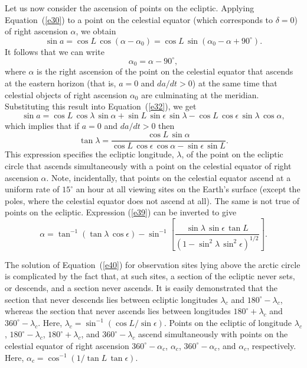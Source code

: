 Let us now consider the ascension of points on the ecliptic.
Applying Equation~(\ref{e30}) to a point on the celestial equator (which corresponds to $\delta=0$)
of right ascension $\alpha$, we obtain
\begin{equation}
\sin a = \cos L\,\cos(\alpha - \alpha_0) = \cos L\,\sin (\alpha_0-\alpha + 90^\circ).
\end{equation}
It follows that we can write
\begin{equation}
\alpha_0 = \alpha-90^\circ,
\end{equation}
where $\alpha$ is the right ascension of the point on the celestial equator that 
ascends at the eastern horizon (that is, $a=0$ and $da/dt>0$) at the same time that celestial objects of right ascension $\alpha_0$ are culminating at
the meridian. Substituting this result into Equation~(\ref{e32}), 
we get
\begin{equation}
\sin a= \cos L\,\cos\lambda\,\sin\alpha + \sin L\,\sin\epsilon\,\sin\lambda - \cos L\,\cos\epsilon\,\sin\lambda\,\cos\alpha,
\end{equation}
which implies that if $a=0$ and $da/dt>0$ then
\begin{equation}\label{e39}
\tan \lambda = \frac{\cos L\,\sin \alpha}{\cos L\,\cos\epsilon\,\cos\alpha-\sin\epsilon\,\sin L}.
\end{equation}
This expression 
specifies the ecliptic longitude, $\lambda$, of the point on the ecliptic circle that 
ascends simultaneously with a point on the celestial equator of right ascension $\alpha$. 
Note, incidentally, that points on the celestial equator  ascend at a  uniform rate of $15^\circ$ an hour at all viewing sites on the Earth's
surface (except the poles, where the celestial equator does not ascend at all). The same is not true of points on the ecliptic. Expression (\ref{e39})
can be inverted to give
\begin{equation}\label{e40}
\alpha = \tan^{-1}(\tan \lambda\,\cos \epsilon) - \sin^{-1}\left[
\frac{\sin \lambda\,\sin \epsilon\,\tan L}{(1-\sin^2\lambda\,\sin^2\epsilon)^{1/2}}\right].
\end{equation}

The solution of Equation~(\ref{e40}) for observation sites lying above
the arctic circle is complicated by the fact that, at such sites, a section of the ecliptic never
sets, or descends,  and a section never ascends. It is easily demonstrated that the
section that never descends lies between ecliptic longitudes
$\lambda_c$ and $180^\circ-\lambda_c$, whereas the section that 
never ascends lies between longitudes $180^\circ+\lambda_c$ and
$360^\circ-\lambda_c$. Here, $\lambda_c=\sin^{-1}(\cos L/\sin\epsilon)$. 
Points on the ecliptic of longitude $\lambda_c$, $180^\circ-\lambda_c$,
$180^\circ+\lambda_c$, and $360^\circ-\lambda_c$ ascend simultaneously
with points on the celestial equator of right ascension
$360^\circ - \alpha_c$, $\alpha_c$, $360^\circ-\alpha_c$, and $\alpha_c$,
respectively. Here, $\alpha_c=\cos^{-1}(1/\tan L\,\tan\epsilon)$. 

